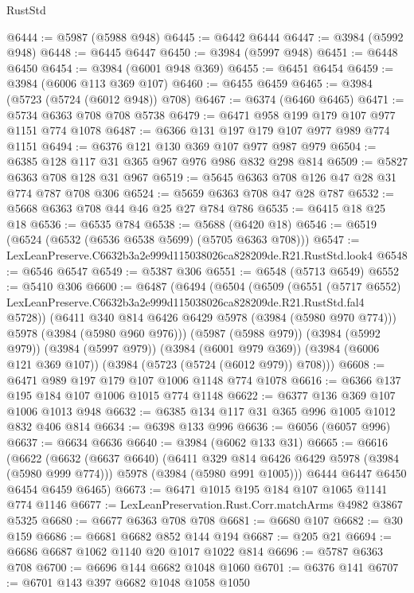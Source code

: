 \begin{lexlean}{RustStd}
\begin{coremodule}
@6444 := @5987 (@5988 @948)
@6445 := @6442 @6444
@6447 := @3984 (@5992 @948)
@6448 := @6445 @6447
@6450 := @3984 (@5997 @948)
@6451 := @6448 @6450
@6454 := @3984 (@6001 @948 @369)
@6455 := @6451 @6454
@6459 := @3984 (@6006 @113 @369 @107)
@6460 := @6455 @6459
@6465 := @3984 (@5723 (@5724 (@6012 @948)) @708)
@6467 := @6374 (@6460 @6465)
@6471 := @5734 @6363 @708 @708 @5738
@6479 := @6471 @958 @199 @179 @107 @977 @1151 @774 @1078
@6487 := @6366 @131 @197 @179 @107 @977 @989 @774 @1151
@6494 := @6376 @121 @130 @369 @107 @977 @987 @979
@6504 := @6385 @128 @117 @31 @365 @967 @976 @986 @832 @298 @814
@6509 := @5827 @6363 @708 @128 @31 @967
@6519 := @5645 @6363 @708 @126 @47 @28 @31 @774 @787 @708 @306
@6524 := @5659 @6363 @708 @47 @28 @787
@6532 := @5668 @6363 @708 @44 @46 @25 @27 @784 @786
@6535 := @6415 @18 @25 @18
@6536 := @6535 @784
@6538 := @5688 (@6420 @18)
@6546 := @6519 (@6524 (@6532 (@6536 @6538 @5699) (@5705 @6363 @708)))
@6547 := LexLeanPreserve.C6632b3a2e999d115038026ca828209de.R21.RustStd.look4
@6548 := @6546 @6547
@6549 := @5387 @306
@6551 := @6548 (@5713 @6549)
@6552 := @5410 @306
@6600 := @6487
    (@6494
      (@6504
        (@6509
          (@6551
            (@5717 @6552)
            LexLeanPreserve.C6632b3a2e999d115038026ca828209de.R21.RustStd.fal4
            @5728))
        (@6411 @340 @814 @6426 @6429 @5978 (@3984 (@5980 @970 @774)))
        @5978
        (@3984 (@5980 @960 @976)))
      (@5987 (@5988 @979))
      (@3984 (@5992 @979))
      (@3984 (@5997 @979))
      (@3984 (@6001 @979 @369))
      (@3984 (@6006 @121 @369 @107))
      (@3984 (@5723 (@5724 (@6012 @979)) @708)))
@6608 := @6471 @989 @197 @179 @107 @1006 @1148 @774 @1078
@6616 := @6366 @137 @195 @184 @107 @1006 @1015 @774 @1148
@6622 := @6377 @136 @369 @107 @1006 @1013 @948
@6632 := @6385 @134 @117 @31 @365 @996 @1005 @1012 @832 @406 @814
@6634 := @6398 @133 @996
@6636 := @6056 (@6057 @996)
@6637 := @6634 @6636
@6640 := @3984 (@6062 @133 @31)
@6665 := @6616
    (@6622
      (@6632
        (@6637 @6640)
        (@6411 @329 @814 @6426 @6429 @5978 (@3984 (@5980 @999 @774)))
        @5978
        (@3984 (@5980 @991 @1005)))
      @6444
      @6447
      @6450
      @6454
      @6459
      @6465)
@6673 := @6471 @1015 @195 @184 @107 @1065 @1141 @774 @1146
@6677 := LexLeanPreservation.Rust.Corr.matchArms @4982 @3867 @5325
@6680 := @6677 @6363 @708 @708
@6681 := @6680 @107
@6682 := @30 @159
@6686 := @6681 @6682 @852 @144 @194
@6687 := @205 @21
@6694 := @6686 @6687 @1062 @1140 @20 @1017 @1022 @814
@6696 := @5787 @6363 @708
@6700 := @6696 @144 @6682 @1048 @1060
@6701 := @6376 @141
@6707 := @6701 @143 @397 @6682 @1048 @1058 @1050

\end{coremodule}
\end{lexlean}
